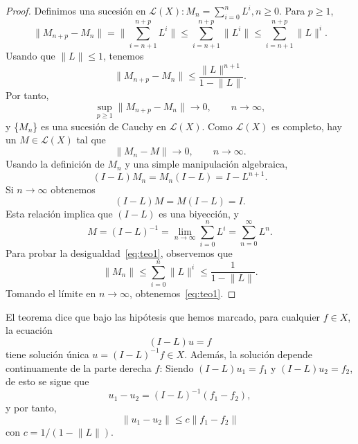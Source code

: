 \begin{proof}
	Definimos una sucesión en $\mathcal{L}(X): M_n = \sum_{i=0}^{n}L^i, n \geqslant 0$. Para $p \geqslant 1$, 
	\begin{equation}
		\lVert M_{n+p} - M_n \rVert = \lVert \sum_{i=n+1}^{n+p}L^i \rVert \leqslant \sum_{i=n+1}^{n+p} \lVert L^i \rVert \leqslant \sum_{i=n+1}^{n+p} \lVert L \rVert^i.
	\end{equation}
	Usando que $\lVert L \rVert \leq 1$, tenemos
	\begin{equation}
		 \lVert M_{n+p} - M_n \rVert \leqslant \dfrac{\lVert L \rVert^{n+1}}{1 - \lVert L \rVert}.
	\end{equation}
	Por tanto,
	\begin{equation}
		\sup_{p \geqslant 1} \lVert M_{n+p} - M_n \rVert \rightarrow 0, \qquad n \rightarrow \infty,
	\end{equation}
	y \{$M_n$\} es una sucesión de Cauchy en $\mathcal{L}(X)$. Como $\mathcal{L}(X)$ es completo, hay un $M \in \mathcal{L}(X)$ tal que
	\begin{equation}
		\lVert M_{n} - M \rVert \rightarrow 0, \qquad n \rightarrow \infty.
	\end{equation}
	Usando la definición de $M_n$ y una simple manipulación algebraica,
	\begin{equation}
		(I-L)M_n = M_n(I-L) = I - L^{n+1}.
	\end{equation}
	Si $n \rightarrow \infty$ obtenemos
	\begin{equation}
		(I-L)M = M(I-L) = I.
	\end{equation}
	Esta relación implica que $(I-L)$ es una biyección, y
	\begin{equation}
		M = (I-L)^{-1} = \lim_{n \rightarrow \infty}\sum_{i=0}^{n}L^i = \sum_{n=0}^{\infty}L^n.
	\end{equation}
	Para probar la desigualdad~\eqref{eq:teo1}, observemos que
	\begin{equation}
		\lVert M_{n} \rVert \leqslant \sum_{i=0}^{n}\lVert L \rVert^i \leqslant \dfrac{1}{1 - \lVert L \rVert}.
	\end{equation}
	Tomando el límite en $n \rightarrow \infty$, obtenemos~\eqref{eq:teo1}.
\end{proof}
\begin{observacion}
	El teorema dice que bajo las hipótesis que hemos marcado, para cualquier $f \in X$, la ecuación
	\begin{equation}\label{eq:teo2}
		(I-L)u = f
	\end{equation}
	tiene solución única $u = (I-L)^{-1}f \in X$. Además, la solución depende continuamente de la parte derecha $f$: Siendo $(I-L)u_1 = f_1$ y $(I-L)u_2 = f_2$, de esto se sigue que
	\begin{equation}
		u_1 - u_2 = (I-L)^{-1}(f_1 - f_2),
	\end{equation}
	y por tanto,
	\begin{equation}
		\lVert u_1 - u_2 \rVert \leqslant c \lVert f_1 - f_2 \rVert
	\end{equation}
	con $c = 1/(1 - \lVert L \rVert)$.
\end{observacion}
